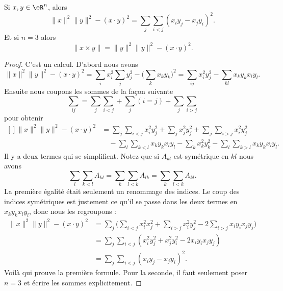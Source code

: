 \begin{proposition}     \label{PROPooMXAIooJureOD}
	Si \( x,y\in \eR^n\), alors
	\begin{equation}
		\| x \|^2\| y \|^2-(x\cdot y)^2=\sum_j\sum_{i<j}(x_iy_j-x_jy_i)^2.
	\end{equation}
	Et si \( n=3\) alors
	\begin{equation}
		\| x\times y \|=\| y \|^2\| y \|^2-(x\cdot y)^2.
	\end{equation}
\end{proposition}

\begin{proof}
	C'est un calcul. D'abord nous avons
	\begin{equation}
		\| x \|^2\| y \|^2-(x\cdot y)^2=\sum_ix_i^2\sum_jy_j^2-\big( \sum_k x_ky_k  \big)^2=\sum_{ij}x_i^2y_j^2-\sum_{kl}x_ky_kx_ly_l.
	\end{equation}
	Ensuite nous coupons les sommes de la façon suivante
	\begin{equation}
		\sum_{ij}=\sum_j\sum_{i<j}+\sum_j(i=j)+\sum_j\sum_{i>j}
	\end{equation}
	pour obtenir
	\begin{equation}
		\begin{aligned}[]
			\| x \|^2\| y \|^2-(x\cdot y)^2 & =\sum_j\sum_{i<j}x_i^2y_j^2+\sum_jx_j^2y_j^2+\sum_j\sum_{i>j}x_i^2y_j^2           \\
			                                & \quad-\sum_l\sum_{k<l}x_ky_kx_ly_l-\sum_kx_k^2y_k^2-\sum_l\sum_{k>l}x_ky_kx_ly_l.
		\end{aligned}
	\end{equation}
	Il y a deux termes qui se simplifient. Notez que si \( A_{kl}\) est symétrique en \( kl\) nous avons
	\begin{equation}
		\sum_l\sum_{k<l}A_{kl}=\sum_k\sum_{l<k}A_{lk}=\sum_k\sum_{l<k}A_{kl}.
	\end{equation}
	La première égalité était seulement un renommage des indices. Le coup des indices symétriques est justement ce qu'il se passe dans les deux termes en\( x_ky_kx_ly_l\), donc nous les regroupons :
	\begin{subequations}
		\begin{align}
			\| x \|^2\| y \|^2-(x\cdot y)^2 & =\sum_j\big( \sum_{i<j}x_i^2x_j^2+\sum_{i>j}x_i^2y_j^2-2\sum_{i>j}x_iy_ix_jy_j \big) \\
			                                & =\sum_j\sum_{i<j}(x_i^2y_j^2+x_j^2y_i^2-2x_iy_ix_jy_j)                               \\
			                                & =\sum_j\sum_{i<j}(x_iy_j-x_jy_i)^2.
		\end{align}
	\end{subequations}
	Voilà qui prouve la première formule. Pour la seconde, il faut seulement poser \( n=3\) et écrire les sommes explicitement.


\end{proof}
